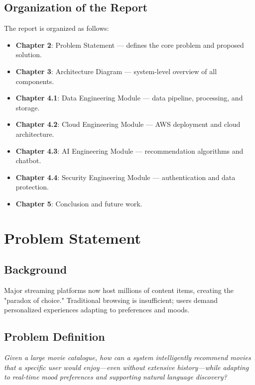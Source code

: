 \documentclass[12pt,a4paper]{report}
\begin{document}
\section{Organization of the Report}

The report is organized as follows:

\begin{itemize}
    \item \textbf{Chapter 2}: Problem Statement --- defines the core problem and proposed solution.
    \item \textbf{Chapter 3}: Architecture Diagram --- system-level overview of all components.
    \item \textbf{Chapter 4.1}: Data Engineering Module --- data pipeline, processing, and storage.
    \item \textbf{Chapter 4.2}: Cloud Engineering Module --- AWS deployment and cloud architecture.
    \item \textbf{Chapter 4.3}: AI Engineering Module --- recommendation algorithms and chatbot.
    \item \textbf{Chapter 4.4}: Security Engineering Module --- authentication and data protection.
    \item \textbf{Chapter 5}: Conclusion and future work.
\end{itemize}

\chapter{Problem Statement}

\section{Background}

Major streaming platforms now host millions of content items, creating the "paradox of choice." Traditional browsing is insufficient; users demand personalized experiences adapting to preferences and moods.

\section{Problem Definition}

\textit{Given a large movie catalogue, how can a system intelligently recommend movies that a specific user would enjoy---even without extensive history---while adapting to real-time mood preferences and supporting natural language discovery?}
\end{document}
